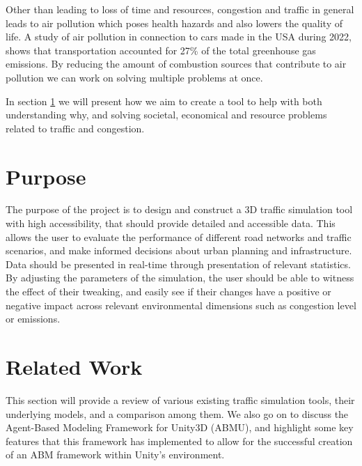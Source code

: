     Other than leading to loss of time and resources, congestion and traffic in general leads to air pollution which poses health hazards and also lowers the quality of life\cite{urban_2004}. A study of air pollution in connection to cars made in the USA during 2022, shows that transportation accounted for 27\% of the total greenhouse gas emissions\cite{treehugger_2022}. By reducing the amount of combustion sources that contribute to air pollution we can work on solving multiple problems at once.

    In section \ref{purpose} we will present how we aim to create a tool to help with both understanding why, and solving societal, economical and resource problems related to traffic and congestion.

\section{Purpose}\label{purpose}
    The purpose of the project is to design and construct a 3D traffic simulation tool with high accessibility, that should provide detailed and accessible data. This allows the user to evaluate the performance of different road networks and traffic scenarios, and make informed decisions about urban planning and infrastructure. Data should be presented in real-time through presentation of relevant statistics. By adjusting the parameters of the simulation, the user should be able to witness the effect of their tweaking, and easily see if their changes have a positive or negative impact across relevant environmental dimensions such as congestion level or emissions.

\section{Related Work} \label{Section_ref}
    This section will provide a review of various existing traffic simulation tools, their underlying models, and a comparison among them. We also go on to discuss the Agent-Based Modeling Framework for Unity3D (ABMU), and highlight some key features that this framework has implemented to allow for the successful creation of an ABM framework within Unity's environment.
